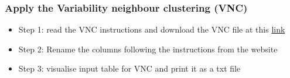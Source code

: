 \documentclass[
]{article}
\begin{document}
\subsubsection{Apply the Variability neighbour clustering
(VNC)}\label{apply-the-variability-neighbour-clustering-vnc}

\begin{itemize}
\item
  Step 1: read the VNC instructions and download the VNC file at this
  \href{(https://global.oup.com/us/companion.websites/fdscontent/uscompanion/us/static/companion.websites/nevalainen/Gries-Hilpert_web_final/vnc.individual.html)}{link}
\item
  Step 2: Rename the columns following the instructions from the website
\item
  Step 3: visualise input table for VNC and print it as a txt file
\end{itemize}
\end{document}

